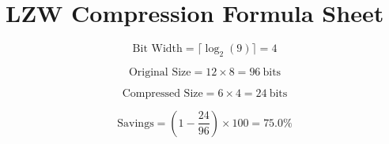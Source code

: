 \documentclass{article}
\begin{document}
\section*{LZW Compression Formula Sheet}

\[
\text{Bit Width} = \lceil \log_2(9) \rceil = 4
\]

\[
\text{Original Size} = 12 \times 8 = 96\ \text{bits}
\]

\[
\text{Compressed Size} = 6 \times 4
= 24\ \text{bits}
\]

\[
\text{Savings} =
\left(1 - \frac{24}{96}\right) \times 100
= 75.0\%
\]
\end{document}
